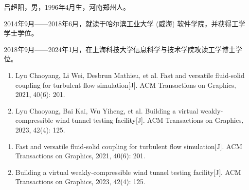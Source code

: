 \documentclass[doctor]{shtthesis}
\makeatletter
\def\ifgraduate{\ifsht@graduate}
\makeatother
\begin{document}
\maketitle

\frontmatter


\makeindices

\ifgraduate

\fi

\mainmatter








\makebiblio

\backmatter


\ifgraduate
\begin{resume}
  吕超阳，男，1996年4月生，河南郑州人。

  2014年9月——2018年6月，就读于哈尔滨工业大学 (威海) 软件学院，并获得工学学士学位。

  2018年9月——2024年1月，在上海科技大学信息科学与技术学院攻读工学博士学位。  
\end{resume}

\begin{publications}
  \begin{enumerate}
    \item Lyu Chaoyang, Li Wei, Desbrun Mathieu, et al. Fast and versatile fluid-solid coupling for turbulent flow simulation[J]. ACM Transactions on Graphics, 2021, 40(6): 201.
    \item Lyu Chaoyang, Bai Kai, Wu Yiheng, et al. Building a virtual weakly-compressible wind tunnel testing facility[J]. ACM Transactions on Graphics, 2023, 42(4): 125.
  \end{enumerate}
\end{publications}

\begin{publications*}
  \begin{enumerate}
    \item Fast and versatile fluid-solid coupling for turbulent flow simulation[J]. ACM Transactions on Graphics, 2021, 40(6): 201.
    \item Building a virtual weakly-compressible wind tunnel testing facility[J]. ACM Transactions on Graphics, 2023, 42(4): 125.
  \end{enumerate}
\end{publications*}



\fi
\end{document}
